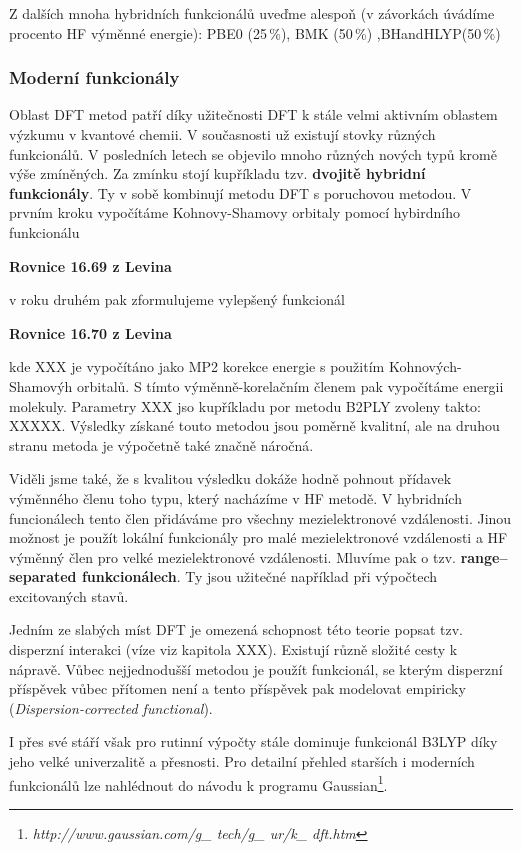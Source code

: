 {Z dalších mnoha hybridních funkcionálů uveďme alespoň (v závorkách úvádíme procento HF výměnné energie): PBE0 (25\,\%), BMK (50\,\%) ,BHandHLYP(50\,\%)

\subsubsection{Moderní funkcionály}
Oblast DFT metod patří díky užitečnosti DFT k stále velmi aktivním oblastem výzkumu v kvantové chemii. V současnosti už existují stovky různých funkcionálů. V posledních letech se objevilo mnoho různých nových typů kromě výše zmíněných. Za zmínku stojí kupříkladu tzv. \textbf{dvojitě hybridní funkcionály}. Ty v sobě kombinují metodu DFT s poruchovou metodou. V prvním kroku vypočítáme Kohnovy-Shamovy orbitaly pomocí hybirdního funkcionálu


\textbf{Rovnice 16.69 z Levina}

v roku druhém pak zformulujeme vylepšený funkcionál

\textbf{Rovnice 16.70 z Levina}

kde XXX je vypočítáno jako MP2 korekce energie s použitím Kohnových-Shamovýh orbitalů. S tímto výměnně-korelačním členem pak vypočítáme energii molekuly. Parametry XXX jso kupříkladu por metodu B2PLY zvoleny takto: XXXXX. Výsledky získané touto metodou jsou poměrně kvalitní, ale na druhou stranu metoda je výpočetně také značně náročná. 


Viděli jsme také, že s kvalitou výsledku dokáže hodně pohnout přídavek výměnného členu toho typu, který nacházíme v HF metodě. V hybridních funcionálech tento člen přidáváme pro všechny mezielektronové vzdálenosti. Jinou možnost je použít lokální funkcionály pro malé mezielektronové vzdálenosti a HF výměnný člen pro velké mezielektronové vzdálenosti. Mluvíme pak o tzv. \textbf{range--separated funkcionálech}. Ty jsou užitečné například při výpočtech excitovaných stavů. 

Jedním ze slabých míst DFT je omezená schopnost této teorie popsat tzv. disperzní interakci (víze viz kapitola XXX). Existují různě složité cesty k nápravě. Vůbec nejjednodušší metodou je použít funkcionál, se kterým disperzní příspěvek vůbec přítomen není a tento příspěvek pak modelovat empiricky (\textit{Dispersion-corrected functional}).  

I přes své stáří však pro rutinní výpočty stále dominuje funkcionál B3LYP díky jeho velké univerzalitě a přesnosti.
Pro detailní přehled starších i moderních funkcionálů lze nahlédnout do návodu k programu Gaussian\footnote{\textit{http://www.gaussian.com/g\_ tech/g\_ ur/k\_ dft.htm}}.


}
